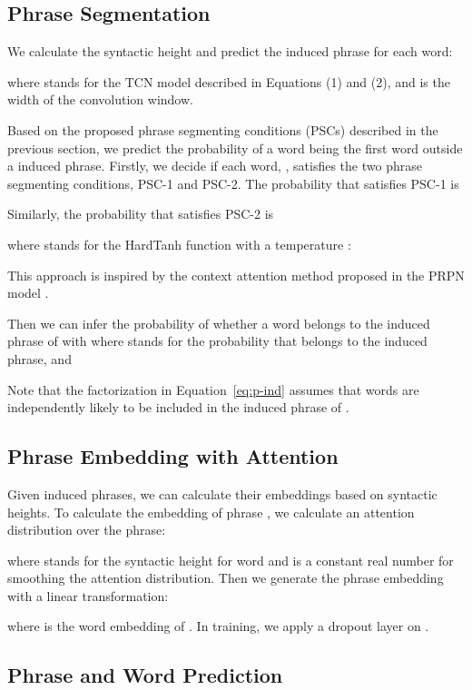 \documentclass[11pt,a4paper]{article}
\begin{document}
\subsection{Phrase Segmentation}

We calculate the syntactic height and predict the induced phrase for each word:

where  stands for the TCN model described in Equations (1) and (2), and  is the width of the convolution window.

Based on the proposed phrase segmenting conditions (PSCs) described in the previous section, we predict the probability of a word being the first word outside a induced phrase. Firstly, we decide if each word, , satisfies the two phrase segmenting conditions, PSC-1 and PSC-2. The probability that  satisfies PSC-1 is 

Similarly, the probability that  satisfies PSC-2 is

where  stands for the HardTanh function with a temperature :

This approach is inspired by the context attention method proposed in the PRPN model \cite{shen2017neural}.

Then we can infer the probability of whether a word belongs to the induced phrase of  with 
where  stands for the probability that  belongs to the induced phrase, and 

Note that the factorization in Equation~\ref{eq:p-ind} assumes that words are independently likely to be included in the induced phrase of . 



\subsection{Phrase Embedding with Attention}

Given induced phrases, we can calculate their embeddings based on syntactic heights. To calculate the embedding of phrase , we calculate an attention distribution over the phrase:

where  stands for the syntactic height for word  and  is a constant real number for smoothing the attention distribution. Then we generate the phrase embedding with a linear transformation:

where  is the word embedding of . In training, we apply a dropout layer on .

\subsection{Phrase and Word Prediction}
\end{document}
